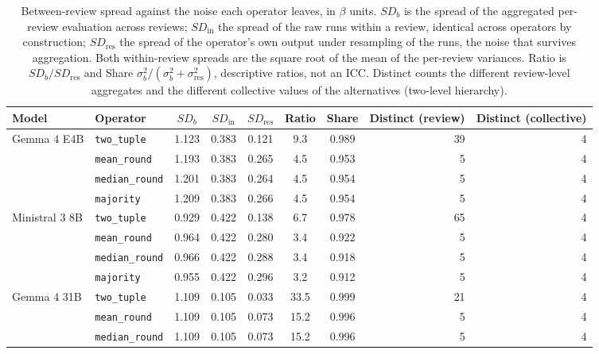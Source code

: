 \begin{table}[htbp]
\centering
\caption{Between-review spread against the noise each operator leaves, in $\beta$ units. $\mathit{SD}_b$ is the spread of the aggregated per-review evaluation across reviews; $\mathit{SD}_{\mathrm{in}}$ the spread of the raw runs within a review, identical across operators by construction; $\mathit{SD}_{\mathrm{res}}$ the spread of the operator's own output under resampling of the runs, the noise that survives aggregation. Both within-review spreads are the square root of the mean of the per-review variances. Ratio is $\mathit{SD}_b/\mathit{SD}_{\mathrm{res}}$ and Share $\sigma^2_b/(\sigma^2_b+\sigma^2_{\mathrm{res}})$, descriptive ratios, not an ICC. Distinct counts the different review-level aggregates and the different collective values of the alternatives (two-level hierarchy).}
\label{tab:cdm_discriminance}
\small
\begin{tabular}{llcccccrr}
\toprule
\textbf{Model} & \textbf{Operator} & \textbf{$\mathit{SD}_b$} & \textbf{$\mathit{SD}_{\mathrm{in}}$} & \textbf{$\mathit{SD}_{\mathrm{res}}$} & \textbf{Ratio} & \textbf{Share} & \textbf{Distinct (review)} & \textbf{Distinct (collective)} \\
\midrule
  \multirow{4}{*}{Gemma 4 E4B} & \texttt{two\_tuple} & 1.123 & 0.383 & 0.121 & 9.3 & 0.989 & 39 & 4 \\
   & \texttt{mean\_round} & 1.193 & 0.383 & 0.265 & 4.5 & 0.953 & 5 & 4 \\
   & \texttt{median\_round} & 1.201 & 0.383 & 0.264 & 4.5 & 0.954 & 5 & 4 \\
   & \texttt{majority} & 1.209 & 0.383 & 0.266 & 4.5 & 0.954 & 5 & 4 \\
\midrule
  \multirow{4}{*}{Ministral 3 8B} & \texttt{two\_tuple} & 0.929 & 0.422 & 0.138 & 6.7 & 0.978 & 65 & 4 \\
   & \texttt{mean\_round} & 0.964 & 0.422 & 0.280 & 3.4 & 0.922 & 5 & 4 \\
   & \texttt{median\_round} & 0.966 & 0.422 & 0.288 & 3.4 & 0.918 & 5 & 4 \\
   & \texttt{majority} & 0.955 & 0.422 & 0.296 & 3.2 & 0.912 & 5 & 4 \\
\midrule
  \multirow{4}{*}{Gemma 4 31B} & \texttt{two\_tuple} & 1.109 & 0.105 & 0.033 & 33.5 & 0.999 & 21 & 4 \\
   & \texttt{mean\_round} & 1.109 & 0.105 & 0.073 & 15.2 & 0.996 & 5 & 4 \\
   & \texttt{median\_round} & 1.109 & 0.105 & 0.073 & 15.2 & 0.996 & 5 & 4 \\

\end{tabular}
\end{table}
